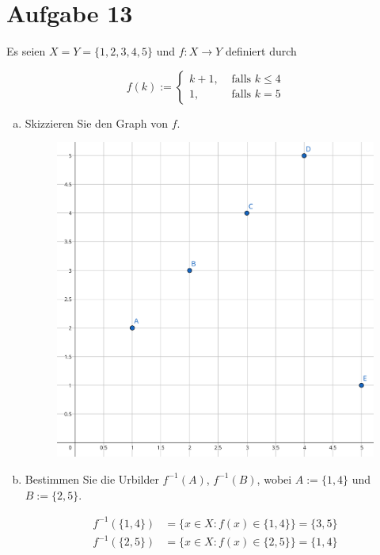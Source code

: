 \section{Aufgabe 13}
\setcounter{section}{13}

Es seien $X = Y = \{1, 2, 3, 4 ,5\}$ und $f : X \rightarrow Y$ definiert durch

\begin{equation*}
    f(k) :=
    \begin{cases}
        k + 1,& \text{ falls } k \leq 4 \\
        1,    & \text{ falls } k =    5
    \end{cases}
\end{equation*}

\begin{enumerate}[(a)]
    \item Skizzieren Sie den Graph von $f$.
        \begin{figure}[h]
            \centering
            \includegraphics{./assets/abbildung-13-01.png}
            \caption{}
        \end{figure}

    \item Bestimmen Sie die Urbilder $f^{-1}(A)$, $f^{-1}(B)$, wobei $A := \{1,4\}$
        und $B := \{2,5\}$.

        \begin{equation*}
            \begin{aligned}
                f^{-1}(\{1, 4\}) &= \{x \in X : f(x) \in \{1, 4\}\} = \{3, 5\} \\[5pt]
                f^{-1}(\{2, 5\}) &= \{x \in X : f(x) \in \{2, 5\}\} = \{1, 4\}
            \end{aligned}
        \end{equation*}
\end{enumerate}
